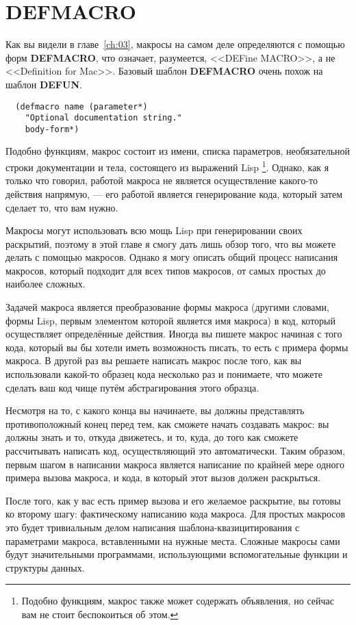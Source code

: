 \section{DEFMACRO}

Как вы видели в главе~\ref{ch:03}, макросы на самом деле определяются с помощью форм
\textbf{DEFMACRO}, что означает, разумеется, <<DEFine MACRO>>, а не <<Definition for
Mac>>. Базовый шаблон \textbf{DEFMACRO} очень похож на шаблон \textbf{DEFUN}.

\begin{lstlisting}
  (defmacro name (parameter*)
    "Optional documentation string."
    body-form*)
\end{lstlisting}

Подобно функциям, макрос состоит из имени, списка параметров, необязательной строки
документации и тела, состоящего из выражений Lisp \footnote{Подобно функциям, макрос также
  может содержать объявления, но сейчас вам не стоит беспокоиться об этом.}. Однако, как я
только что говорил, работой макроса не является осуществление какого-то действия напрямую,
--- его работой является генерирование кода, который затем сделает то, что вам нужно.

Макросы могут использовать всю мощь Lisp при генерировании своих раскрытий, поэтому в этой
главе я смогу дать лишь обзор того, что вы можете делать с помощью макросов. Однако я могу
описать общий процесс написания макросов, который подходит для всех типов макросов, от
самых простых до наиболее сложных.

Задачей макроса является преобразование формы макроса (другими словами, формы Lisp, первым
элементом которой является имя макроса) в код, который осуществляет определённые
действия. Иногда вы пишете макрос начиная с того кода, который вы бы хотели иметь
возможность писать, то есть с примера формы макроса. В другой раз вы решаете написать
макрос после того, как вы использовали какой-то образец кода несколько раз и понимаете,
что можете сделать ваш код чище путём абстрагирования этого образца.

Несмотря на то, с какого конца вы начинаете, вы должны представлять противоположный конец
перед тем, как сможете начать создавать макрос: вы должны знать и то, откуда движетесь, и
то, куда, до того как сможете рассчитывать написать код, осуществляющий это
автоматически. Таким образом, первым шагом в написании макроса является написание по
крайней мере одного примера вызова макроса, и кода, в который этот вызов должен
раскрыться.

После того, как у вас есть пример вызова и его желаемое раскрытие, вы готовы ко второму
шагу: фактическому написанию кода макроса. Для простых макросов это будет тривиальным
делом написания шаблона-квазицитирования с параметрами макроса, вставленными на нужные
места. Сложные макросы сами будут значительными программами, использующими вспомогательные
функции и структуры данных.

